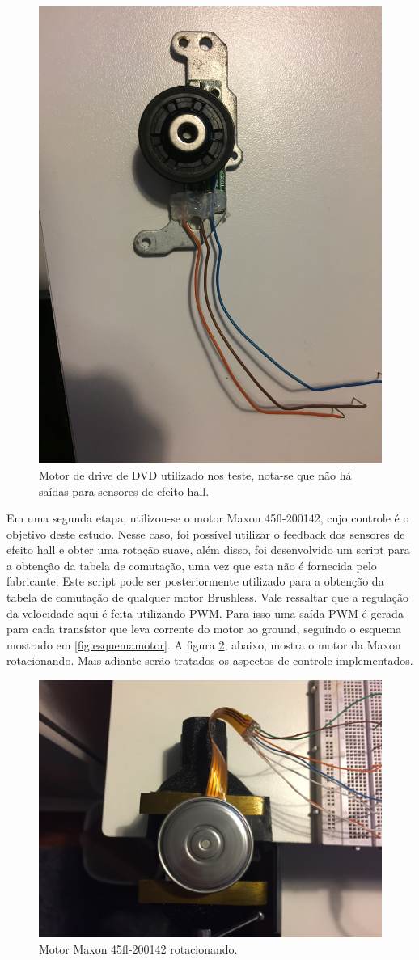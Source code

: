 \documentclass[a4paper,11pt]{article}
\begin{document}
		\begin{figure}[ht]
			\centering
			\includegraphics[width=0.5\linewidth]{images/motorantigo}
			\caption{Motor de drive de DVD utilizado nos teste, nota-se que não há saídas para sensores de efeito hall.}
			\label{fig:motorantigo}
		\end{figure}
	
		\newpage
		
		Em uma segunda etapa, utilizou-se o motor Maxon 45fl-200142, cujo controle é o objetivo deste estudo. Nesse caso, foi possível utilizar o feedback dos sensores de efeito hall e obter uma rotação suave, além disso, foi desenvolvido um script para a obtenção da tabela de comutação, uma vez que esta não é fornecida pelo fabricante. Este script pode ser posteriormente utilizado para a obtenção da tabela de comutação de qualquer motor Brushless. Vale ressaltar que a regulação da velocidade aqui é feita utilizando PWM. Para isso uma saída PWM é gerada para cada transístor que leva corrente do motor ao ground, seguindo o esquema mostrado em \ref{fig:esquemamotor}.
		A figura \ref{fig:motornovo}, abaixo, mostra o motor da Maxon rotacionando. Mais adiante serão tratados os aspectos de controle implementados.
		
		\begin{figure}[ht]
			\centering
			\includegraphics[width=0.5\linewidth]{images/motornovo}
			\caption{Motor Maxon 45fl-200142 rotacionando.}
			\label{fig:motornovo}
		\end{figure}
	
\end{document}
